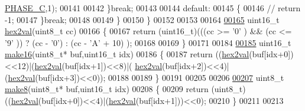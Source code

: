 \begin{DoxyCode}
      \hyperlink{a00043_a3ceb83fb10c2af19b468d508448f24e2}{PHASE\_C},1);
00141                     
00142                 \}\textcolor{keywordflow}{break};
00143                 
00144                 \textcolor{keywordflow}{default}:
00145                 \{    
00146                   \textcolor{comment}{// return -1;}
00147                 \}\textcolor{keywordflow}{break};
00148      
00149         \}
00150 \}
00152  
00153  
00164 
\hypertarget{a00042_source_l00165}{}\hyperlink{a00009_gab120dc4bec6b4097a5cd3ebb91131c57}{00165} uint16\_t  \hyperlink{a00009_gab120dc4bec6b4097a5cd3ebb91131c57}{hex2val}(uint8\_t cc)
00166 \{
00167     \textcolor{keywordflow}{return}  (uint16\_t)(((cc >= \textcolor{charliteral}{'0'} ) && (cc <= \textcolor{charliteral}{'9'} )) ? (cc - \textcolor{charliteral}{'0'}) : (cc - \textcolor{charliteral}{'A'} + 10) );
00168      
00169 \}
00171 
00184 
\hypertarget{a00042_source_l00185}{}\hyperlink{a00009_ga1e74920f34a07a82cca58eab71ed12b3}{00185} uint16\_t  \hyperlink{a00009_ga1e74920f34a07a82cca58eab71ed12b3}{make16}(uint8\_t* buf,uint16\_t idx)
00186 \{
00187     \textcolor{keywordflow}{return} ((\hyperlink{a00009_gab120dc4bec6b4097a5cd3ebb91131c57}{hex2val}(buf[idx+0])<<12)|(\hyperlink{a00009_gab120dc4bec6b4097a5cd3ebb91131c57}{hex2val}(buf[idx+1])<<8)|(
      \hyperlink{a00009_gab120dc4bec6b4097a5cd3ebb91131c57}{hex2val}(buf[idx+2])<<4)|(\hyperlink{a00009_gab120dc4bec6b4097a5cd3ebb91131c57}{hex2val}(buf[idx+3])<<0));    
00188 
00189 \}
00191 
00205 
00206 
\hypertarget{a00042_source_l00207}{}\hyperlink{a00009_gaefa26c3e5b22ccbe5de1c33305f20e1b}{00207} uint8\_t  \hyperlink{a00009_gaefa26c3e5b22ccbe5de1c33305f20e1b}{make8}(uint8\_t* buf,uint16\_t idx)
00208 \{
00209     \textcolor{keywordflow}{return} (uint8\_t)((\hyperlink{a00009_gab120dc4bec6b4097a5cd3ebb91131c57}{hex2val}(buf[idx+0])<<4)|(\hyperlink{a00009_gab120dc4bec6b4097a5cd3ebb91131c57}{hex2val}(buf[idx+1]))<<0);    
00210 \}
00211 
00213 
\end{DoxyCode}
